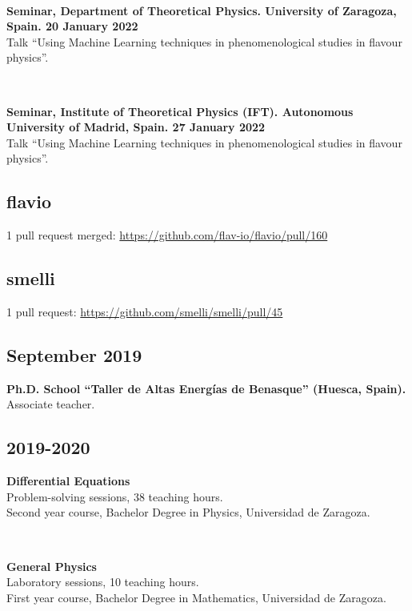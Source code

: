 \documentclass{cvf}
\begin{document}
~

\textbf{Seminar, Department of Theoretical Physics. University of Zaragoza, Spain. 20 January 2022}\\
Talk ``Using Machine Learning techniques in phenomenological studies in flavour physics''.

~

\textbf{Seminar, Institute of Theoretical Physics (IFT). Autonomous University of Madrid, Spain. 27 January 2022}\\
Talk ``Using Machine Learning techniques in phenomenological studies in flavour physics''.


\subsection{flavio}
1 pull request merged: \url{https://github.com/flav-io/flavio/pull/160}

\subsection{smelli}
1 pull request: \url{https://github.com/smelli/smelli/pull/45}


\subsection{September 2019}
\hspace{\parindent}\textbf{Ph.D. School ``Taller de Altas Energías de Benasque'' (Huesca, Spain).}\\
Associate teacher.

\subsection{2019-2020}
\hspace{\parindent}\textbf{Differential Equations}\\
Problem-solving sessions, 38 teaching hours.\\
Second year course, Bachelor Degree in Physics, Universidad de Zaragoza.

~

\textbf{General Physics}\\
Laboratory sessions, 10 teaching hours.\\
First year course, Bachelor Degree in Mathematics, Universidad de Zaragoza.
\end{document}
